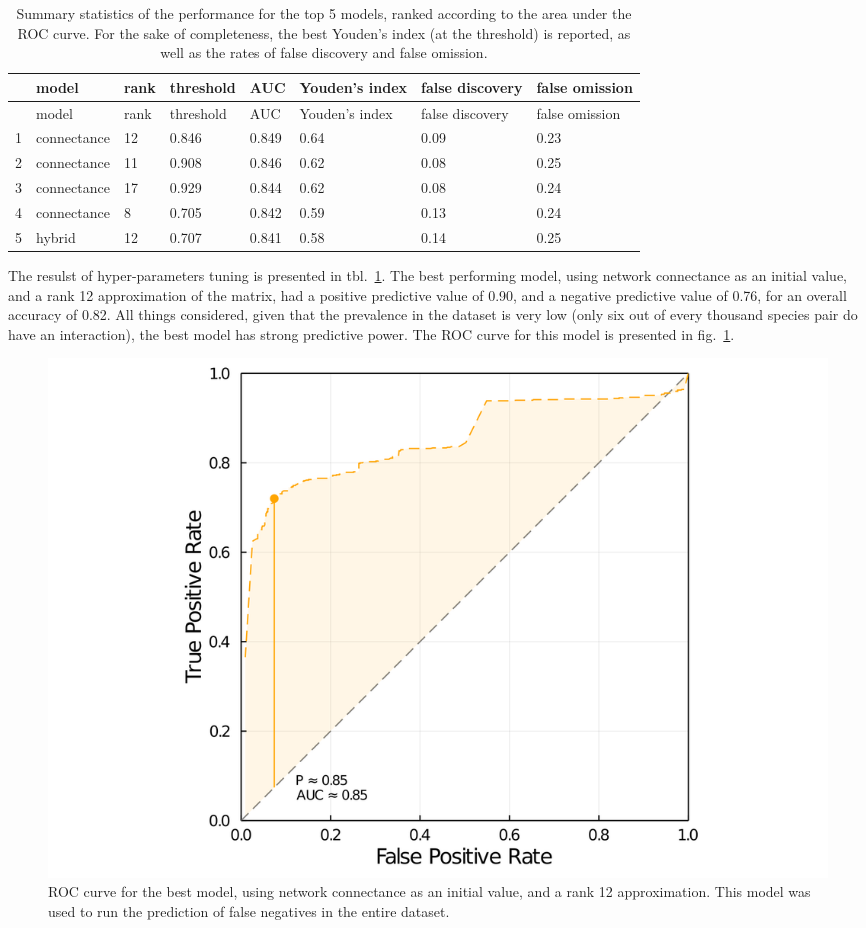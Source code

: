\documentclass[11pt]{article}
\makeatletter
\def\maxwidth{\ifdim\Gin@nat@width>\linewidth\linewidth
\else\Gin@nat@width\fi}
\let\Oldincludegraphics\includegraphics
\renewcommand{\includegraphics}[1]{\Oldincludegraphics[width=\maxwidth]{#1}}
\makeatother
\begin{document}
\hypertarget{tbl:modelselection}{}
\begin{longtable}[]{@{}llllllll@{}}
\caption{\label{tbl:modelselection}Summary statistics of the performance
for the top 5 models, ranked according to the area under the ROC curve.
For the sake of completeness, the best Youden's index (at the threshold)
is reported, as well as the rates of false discovery and false
omission.}\tabularnewline
\toprule
& model & rank & threshold & AUC & Youden's index & false discovery &
false omission\tabularnewline
\midrule
\endfirsthead
\toprule
& model & rank & threshold & AUC & Youden's index & false discovery &
false omission\tabularnewline
\midrule
\endhead
1 & connectance & 12 & 0.846 & 0.849 & 0.64 & 0.09 & 0.23\tabularnewline
2 & connectance & 11 & 0.908 & 0.846 & 0.62 & 0.08 & 0.25\tabularnewline
3 & connectance & 17 & 0.929 & 0.844 & 0.62 & 0.08 & 0.24\tabularnewline
4 & connectance & 8 & 0.705 & 0.842 & 0.59 & 0.13 & 0.24\tabularnewline
5 & hybrid & 12 & 0.707 & 0.841 & 0.58 & 0.14 & 0.25\tabularnewline
\bottomrule
\end{longtable}

The resulst of hyper-parameters tuning is presented in
tbl.~\ref{tbl:modelselection}. The best performing model, using network
connectance as an initial value, and a rank 12 approximation of the
matrix, had a positive predictive value of 0.90, and a negative
predictive value of 0.76, for an overall accuracy of 0.82. All things
considered, given that the prevalence in the dataset is very low (only
six out of every thousand species pair do have an interaction), the best
model has strong predictive power. The ROC curve for this model is
presented in fig.~\ref{fig:roc}.

\begin{figure}
\hypertarget{fig:roc}{%
\centering
\includegraphics{figures/best-model-roc.png}
\caption{ROC curve for the best model, using network connectance as an
initial value, and a rank 12 approximation. This model was used to run
the prediction of false negatives in the entire dataset.}\label{fig:roc}
}
\end{figure}
\end{document}
